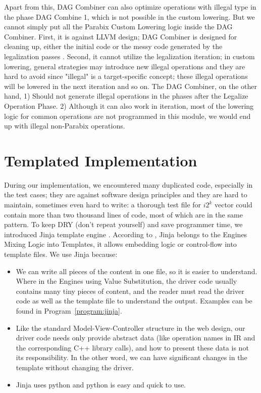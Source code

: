 Apart from this, DAG Combiner can also optimize operations with illegal type in the phase DAG Combine 1, which is not possible in the custom lowering. But we cannot simply put all the Parabix Custom Lowering logic inside the DAG Combiner. First, it is against LLVM design; DAG Combiner is designed for cleaning up, either the initial code or the messy code generated by the legalization passes \cite{llvm_code_gen}. Second, it cannot utilize the legalization iteration; in custom lowering, general strategies may introduce new illegal operations and they are hard to avoid since "illegal" is a target-specific concept; these illegal operations will be lowered in the next iteration and so on. The DAG Combiner, on the other hand, 1) Should not generate illegal operations in the phases after the Legalize Operation Phase. 2) Although it can also work in iteration, most of the lowering logic for common operations are not programmed in this module, we would end up with illegal non-Parabix operations.

\section{Templated Implementation}
During our implementation, we encountered many duplicated code, especially in the test cases; they are against software design principles and they are hard to maintain, sometimes even hard to write: a thorough test file for $i2^k$ vector could contain more than two thousand lines of code, most of which are in the same pattern. To keep DRY (don't repeat yourself) and save programmer time, we introduced Jinja template engine \cite{jinja_engine}. According to \cite{python_templating}, Jinja belongs to the Engines Mixing Logic into Templates, it allows embedding logic or control-flow into template files. We use Jinja because:

\begin{itemize}
    \item We can write all pieces of the content in one file, so it is easier to understand. Where in the Engines using Value Substitution, the driver code usually contains many tiny pieces of content, and the reader must read the driver code as well as the template file to understand the output. Examples can be found in Program~\ref{program:jinja}.
    \item Like the standard Model-View-Controller structure in the web design, our driver code needs only provide abstract data (like operation names in IR and the corresponding C++ library calls), and how to present these data is not its responsibility. In the other word, we can have significant changes in the template without changing the driver.
    \item Jinja uses python and python is easy and quick to use.
\end{itemize}

